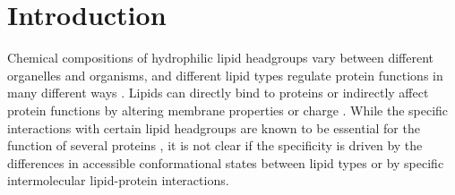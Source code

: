 \documentclass[aps,prl,superscriptaddress,twocolumn]{revtex4}
\begin{document}

\maketitle %



\section{Introduction}

Chemical compositions of hydrophilic lipid headgroups vary between different
organelles and organisms, and different lipid types
regulate protein functions in many different ways \cite{lee03,vanmeer08}.
Lipids can directly bind to proteins or indirectly affect protein
functions by altering membrane properties or charge \cite{lee03,lemmon08}.
While the specific interactions with certain lipid headgroups
are known to be essential for the function of several proteins \cite{lee11,lemmon08},
it is not clear if the specificity is driven by the differences in accessible
conformational states between lipid types or
by specific intermolecular lipid-protein interactions.
\end{document}
